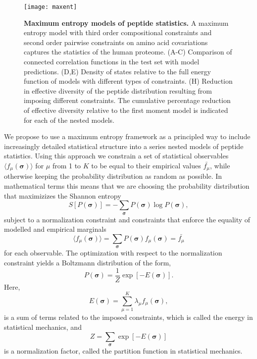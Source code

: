 \documentclass[superscriptaddress,twocolumn,pre]{revtex4}
\newcommand{\B}{\boldsymbol}
\newcommand{\<}{\langle}
\renewcommand{\>}{\rangle}
\begin{document}
\begin{figure*}
    \texttt{[image: maxent]}
        \caption{{\bf Maximum entropy models of peptide statistics.} A maximum entropy model with third order compositional constraints and second order pairwise constraints on amino acid covariations captures the statistics of the human proteome. (A-C) Comparison of connected correlation functions in the test set with model predictions. (D,E) Density of states relative to the full energy function of models with different types of constraints. (H) Reduction in effective diversity of the peptide distribution resulting from imposing different constraints. The cumulative percentage reduction of effective diversity relative to the first moment model is indicated for each of the nested models.
    \label{figmaxent}
    }
\end{figure*}

We propose to use a maximum entropy framework as a principled way to include increasingly detailed statistical structure into a series nested models of peptide statistics. Using this approach we constrain a set of statistical observables $\langle f_\mu(\boldsymbol \sigma)\rangle$ for $\mu$ from 1 to $K$ to be equal to their empirical values $\bar{f_\mu}$, while otherwise keeping the probability distribution as random as possible. In mathematical terms this means that we are choosing the probability distribution that maximizizes the Shannon entropy
\begin{equation}
    S[P(\B \sigma)] = - \sum_{\B \sigma} P(\B \sigma) \log P(\B \sigma),
\end{equation}
subject to a normalization constraint and constraints that enforce the equality of modelled and empirical marginals
\begin{equation}
    \langle f_\mu(\boldsymbol \sigma)\rangle = \sum_{\boldsymbol \sigma} P(\boldsymbol \sigma) f_\mu(\boldsymbol \sigma) = \bar{f_\mu}
\end{equation}
for each observable.
The optimization with respect to the normalization constraint yields a Boltzmann distribution of the form,
\begin{equation}
    P(\boldsymbol \sigma) = \frac{1}{Z} \exp\left[ -E(\B \sigma) \right].
\end{equation}
Here,
\begin{equation}
 E(\B \sigma) = \sum_{\mu=1}^K \lambda_\mu f_\mu(\boldsymbol \sigma),
\end{equation}
is a sum of terms related to the imposed constraints, which is called the energy in statistical mechanics, and 
\begin{equation}
    Z = \sum_{\B \sigma} \exp \left[ - E(\B \sigma) \right]
\end{equation}
is a normalization factor, called the partition function in statistical mechanics.
\end{document}
